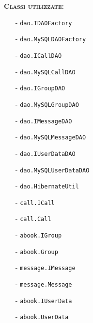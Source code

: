 \begin{description}
	\item{\scshape\bfseries Classi utilizzate:}
	\begin{itemize}[nolistsep, noitemsep]
	  \item[-] \texttt{dao.IDAOFactory}
	  \item[-] \texttt{dao.MySQLDAOFactory}
	  \item[-] \texttt{dao.ICallDAO}
	  \item[-] \texttt{dao.MySQLCallDAO}
	  \item[-] \texttt{dao.IGroupDAO}
	  \item[-] \texttt{dao.MySQLGroupDAO}
	  \item[-] \texttt{dao.IMessageDAO}
	  \item[-] \texttt{dao.MySQLMessageDAO}
	  \item[-] \texttt{dao.IUserDataDAO}
	  \item[-] \texttt{dao.MySQLUserDataDAO}
	  \item[-] \texttt{dao.HibernateUtil}
	  \item[-] \texttt{call.ICall}
	  \item[-] \texttt{call.Call}
	  \item[-] \texttt{abook.IGroup}
	  \item[-] \texttt{abook.Group}
	  \item[-] \texttt{message.IMessage}
	  \item[-] \texttt{message.Message}
	  \item[-] \texttt{abook.IUserData}
	  \item[-] \texttt{abook.UserData}
	\end{itemize}
\end{description}


